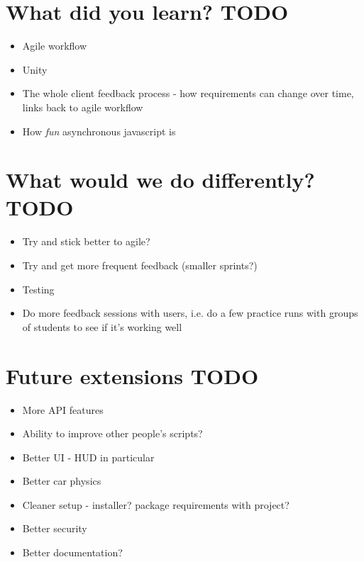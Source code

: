 \section{What did you learn? TODO}
\begin{itemize}
    \item
        Agile workflow
    \item
        Unity
    \item
        The whole client feedback process - how requirements can change over
        time, links back to agile workflow
    \item
        How \textit{fun} asynchronous javascript is
\end{itemize}

\section{What would we do differently? TODO}
\begin{itemize}
    \item
        Try and stick better to agile?
    \item
        Try and get more frequent feedback (smaller sprints?)
    \item
        Testing
    \item
        Do more feedback sessions with users, i.e. do a few practice runs with
        groups of students to see if it's working well
\end{itemize}

\section{Future extensions TODO}
\begin{itemize}
    \item
        More API features
    \item
        Ability to improve other people's scripts?
    \item
        Better UI - HUD in particular
    \item
        Better car physics
    \item
        Cleaner setup - installer? package requirements with project?
    \item
        Better security
    \item
        Better documentation?
\end{itemize}
